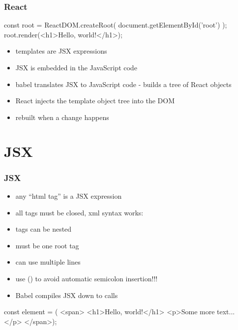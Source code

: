 \begin{frame}[fragile] \frametitle{React}
\begin{CodeBox}{}
const root = ReactDOM.createRoot(
  document.getElementById('root')
);
root.render(<h1>Hello, world!</h1>);
\end{CodeBox}

\vspace{8mm}
\begin{itemize}
  \item templates are JSX expressions
  \item JSX is embedded in the JavaScript code
  \item babel translates JSX to JavaScript code - builds a tree of React objects
  \item React injects the template object tree into the DOM
  \item rebuilt when a change happens
\end{itemize}

\end{frame}

\section{JSX}
\begin{frame}[fragile] \frametitle{JSX}
\begin{itemize}
  \item any ``html tag'' is a JSX expression
  \item all tags must be closed, xml syntax works: 
  \item tags can be nested
  \item must be one root tag
  \item can use multiple lines
  \item use () to avoid automatic semicolon insertion!!!
  \item Babel compiles JSX down to  calls
\end{itemize}

\begin{CodeBox}{}
const element = (
<span>
  <h1>Hello, world!</h1>
  <p>Some more text...</p>
</span>);
\end{CodeBox}
\end{frame}

